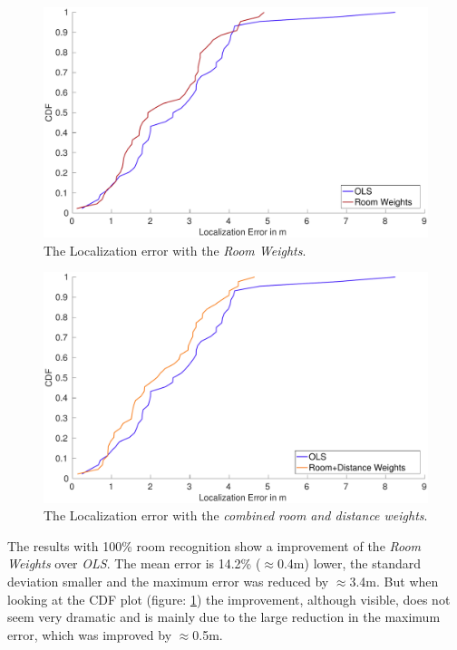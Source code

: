 \begin{figure}[p]
\centering
\includegraphics[width=\textwidth]{Figures/WeightingCDF_RW}
\decoRule
\caption[Weighting method comparison]{The Localization error with the \emph{Room Weights}.}
\label{fig:WeightingCDFRoom}
\end{figure}

\begin{figure}[p]
\centering
\includegraphics[width=\textwidth]{Figures/WeightingCDF_RDW}
\decoRule
\caption[Weighting method comparison]{The Localization error with the \emph{combined room and distance weights}.}
\label{fig:WeightingCDFRoomDistance}
\end{figure}

The results with 100\% room recognition show a improvement of the \emph{Room Weights} over \emph{OLS}. The mean error is 14.2\% ($\approx$0.4m) lower, the standard deviation smaller and the maximum error was reduced by $\approx$3.4m. But when looking at the CDF plot (figure: \ref{fig:WeightingCDFRoom}) the improvement, although visible, does not seem very dramatic and is mainly due to the large reduction in the maximum error, which was improved by $\approx$0.5m.

